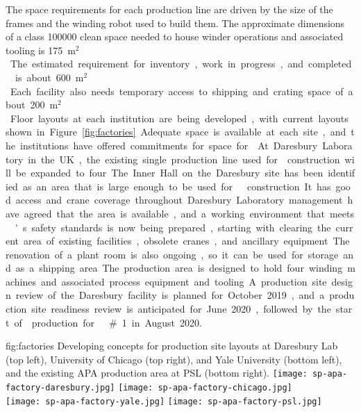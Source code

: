 The space requirements for each production line are driven by the size of the  frames and the winding robot used to build them. The approximate dimensions of a class \num{100000} clean space needed to house winder operations and associated tooling is \SI{175}{m$^2$}. The estimated requirement for inventory, work in progress, and completed  is about \SI{600}{m$^2$}. Each facility  also needs temporary access to shipping and crating space of about \SI{200}{m$^2$}. Floor layouts at each institution are being developed, with current layouts shown in Figure~\ref{fig:factories}. Adequate space is available at each site, and the institutions have offered commitments for space for . 

At Daresbury Laboratory in the UK, the existing single production line used for  construction will be expanded to four.  The Inner Hall on the Daresbury site has been identified as an area that is large enough to be used for   construction. It has good access and crane coverage throughout. Daresbury Laboratory management have agreed that the area is available, and a working environment that meets 's safety standards is now being prepared, starting with clearing the current area of existing facilities, obsolete cranes, and ancillary equipment. The renovation of a plant room is also ongoing, so it can be used for storage and as a shipping area. The production area is designed to hold four winding machines and associated process equipment and tooling.  A production site design review of the Daresbury facility is planned for October 2019, and a production site readiness review is anticipated for June 2020, followed by the start of  production for   \#1 in August 2020.  

\begin{dunefigure}{fig:factories}
{Developing concepts for production site layouts at Daresbury Lab (top left), University of Chicago (top right), and Yale University (bottom left), and the existing APA production area at PSL (bottom right).}
\texttt{[image: sp-apa-factory-daresbury.jpg]} 
\texttt{[image: sp-apa-factory-chicago.jpg]} \\
\vspace{1mm}
\texttt{[image: sp-apa-factory-yale.jpg]}
\texttt{[image: sp-apa-factory-psl.jpg]} 
\end{dunefigure}

